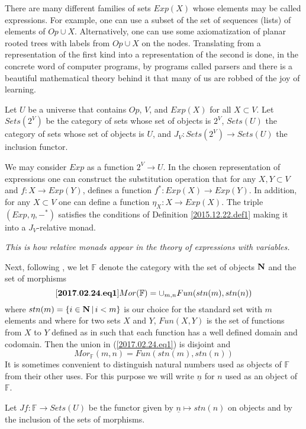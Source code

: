 \documentclass[12pt]{amsart}
\newenvironment{eq}{\begin{equation}}{\end{equation}}
\newcommand{\llabel}[1]{\label{#1}[{\bf #1}]}
\newcommand{\sr}{\rightarrow}
\newcommand{\nn}{{\bf N\rm}}
\newcommand{\nat}{\nn}
\newcommand{\uu}{\underline}
\newcommand{\mbind}[1]{{#1^*}}
\newcommand{\FF}{{\mathbb F}}
\newcommand{\ff}[1]{\uu{#1}}
\begin{document}
There are many different families of sets $Exp(X)$ whose elements may be called expressions. For example, one can use a subset of the set of sequences (lists) of elements of $Op\cup X$. Alternatively, one can use some axiomatization of planar rooted trees with labels from $Op\cup X$ on the nodes. Translating from a representation of the first kind into a representation of the second is done, in the concrete word of computer programs, by programs called parsers and there is a beautiful mathematical theory behind it that many of us are robbed of the joy of learning. 

Let $U$ be a universe that contains $Op$, $V$, and $Exp(X)$ for all $X\subset V$. Let $Sets(2^V)$ be the category of sets whose set of objects is $2^V$, $Sets(U)$ the category of sets whose set of objects is $U$, and $J_V:Sets(2^V)\sr Sets(U)$ the inclusion functor. 

We may consider $Exp$ as a function $2^V\sr U$. In the chosen representation of expressions one can construct the substitution operation that for any $X,Y\subset V$ and $f:X\sr Exp(Y)$, defines a function $\mbind{f}:Exp(X)\sr Exp(Y)$. In addition, for any $X\subset V$ one can define a function $\eta_{X}:X\sr Exp(X)$. The triple $(Exp,\eta,\mbind{-})$ satisfies the conditions of Definition \ref{2015.12.22.def1} making it into a $J_V$-relative monad.

{\em This is how relative monads appear in the theory of expressions with variables.}

Next, following \cite{FPT}, we let $\FF$ denote the category with the set of objects $\nat$ and the set of morphisms 
%
\begin{eq}
\llabel{2017.02.24.eq1}
Mor(\FF)=\cup_{m,n}Fun(stn(m),stn(n))
\end{eq}
%
where $stn(m)=\{i\in\nat\,|\,i<m\}$ is our choice for the standard set with $m$ elements and where for two sets $X$ and $Y$, $Fun(X,Y)$ is the set of functions from $X$ to $Y$ defined as in \cite[p.81]{Bourbaki.Sets} such that each function has a well defined domain and codomain. Then the union in (\ref{2017.02.24.eq1}) is disjoint and 
%
$$Mor_{\FF}(m,n)=Fun(stn(m),stn(n))$$
%
It is sometimes convenient to distinguish natural numbers used as objects of $\FF$ from their other uses. For this purpose we will write $\ff{n}$ for $n$ used as an object of $\FF$. 

Let $Jf:\FF\sr Sets(U)$ be the functor given by $\ff{n}\mapsto  stn(n)$ on objects and by the inclusion of the sets of morphisms. 
\end{document}
